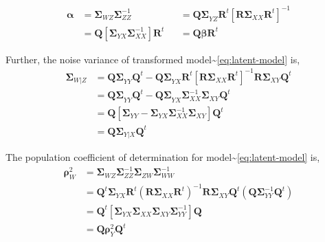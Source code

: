 \documentclass[12pt,A4paper,authoryear]{elsarticle} %
\providecommand{\tightlist}{%
  \setlength{\itemsep}{0pt}\setlength{\parskip}{0pt}}
\begin{document}
\begin{description}
\tightlist
\item[Regression Coefficients]
\[
  \begin{aligned}
  \boldsymbol{\alpha} &= \boldsymbol{\Sigma}_{WZ} \boldsymbol{\Sigma}_{ZZ}^{-1}
  &&= \boldsymbol{Q\Sigma}_{YZ}\mathbf{R}^t\left[\boldsymbol{R\Sigma}_{XX}\mathbf{R}^t\right]^{-1} \\
  &= \mathbf{Q}\left[\boldsymbol{\Sigma}_{YX}\boldsymbol{\Sigma}_{XX}^{-1}\right]\mathbf{R}^t
  &&= \mathbf{Q}\boldsymbol{\beta}\mathbf{R}^t
  \end{aligned}
  \]
\item[Error Variance]
Further, the noise variance of transformed
model\textasciitilde{}\eqref{eq:latent-model} is, \[
  \begin{aligned}
\boldsymbol{\Sigma}_{W|Z}
&= \boldsymbol{Q\Sigma}_{YY}\mathbf{Q}^t -
  \boldsymbol{Q \Sigma}_{YX}\mathbf{R}^t \left[\boldsymbol{R\Sigma}_{XX}\boldsymbol{R}^t\right]^{-1}
  \boldsymbol{R\Sigma}_{XY}\mathbf{Q}^t \nonumber \\
&= \boldsymbol{Q\Sigma}_{YY}\mathbf{Q}^t - 
  \boldsymbol{Q \Sigma}_{YX}\boldsymbol{\Sigma}_{XX}^{-1}\boldsymbol{\Sigma}_{XY}\mathbf{Q}^t \nonumber \\
&= \mathbf{Q}\left[\boldsymbol{\Sigma}_{YY} -
  \boldsymbol{\Sigma}_{YX}\boldsymbol{\Sigma}_{XX}^{-1}\boldsymbol{\Sigma}_{XY}\right]\mathbf{Q}^{t} \nonumber \\
&= \mathbf{Q} \boldsymbol{\Sigma}_{Y|X}\mathbf{Q}^t
  \end{aligned}
  \]
\item[Population Coefficient of Determination]
The population coefficient of determination for
model\textasciitilde{}\eqref{eq:latent-model} is, \[
  \begin{aligned}
\boldsymbol{\rho}^2_W &= \boldsymbol{\Sigma}_{WZ} 
\boldsymbol{\Sigma}_{ZZ}^{-1} \boldsymbol{\Sigma}_{ZW} 
\boldsymbol{\Sigma}_{WW}^{-1} \\
  &=\mathbf{Q}^t
  \boldsymbol{\Sigma}_{YX}\mathbf{R}^t \left(\mathbf{R}\boldsymbol{\Sigma}_{XX}\mathbf{R}^t\right)^{-1}
  \mathbf{R}\boldsymbol{\Sigma}_{XY}\mathbf{Q}^t \left(\mathbf{Q} \boldsymbol{\Sigma}_{YY}^{-1} \mathbf{Q}^t\right) \nonumber \\
  &=\mathbf{Q}^t\left[\boldsymbol{\Sigma}_{YX}\boldsymbol{\Sigma}_{XX}\boldsymbol{\Sigma}_{XY}\boldsymbol{\Sigma}_{YY}^{-1}\right]\mathbf{Q} \\
  &= \mathbf{Q}\boldsymbol{\rho}_{Y}^2 \mathbf{Q}^t
  \end{aligned}
  \]
\end{description}
\end{document}
